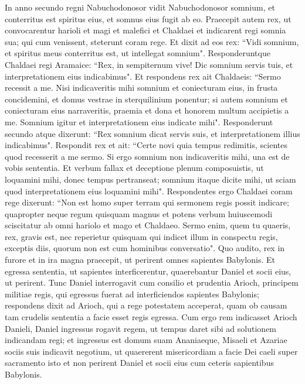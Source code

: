 \begin{biblechapter}  
\verse In anno secundo regni Nabuchodonosor vidit Nabuchodonosor somnium, et conterritus est spiritus eius, et somnus eius fugit ab eo. 
\verse Praecepit autem rex, ut convocarentur harioli et magi et malefici et Chaldaei et indicarent regi somnia sua; qui cum venissent, steterunt coram rege. 
\verse Et dixit ad eos rex: “Vidi somnium, et spiritus meus conterritus est, ut intellegat somnium". 
\verse Responderuntque Chaldaei regi Aramaice: “Rex, in sempiternum vive! Dic somnium servis tuis, et interpretationem eius indicabimus". 
\verse Et respondens rex ait Chaldaeis: “Sermo recessit a me. Nisi indicaveritis mihi somnium et coniecturam eius, in frusta concidemini, et domus vestrae in sterquilinium ponentur; 
\verse si autem somnium et coniecturam eius narraveritis, praemia et dona et honorem multum accipietis a me. Somnium igitur et interpretationem eius indicate mihi".  
\verse Responderunt secundo atque dixerunt: “Rex somnium dicat servis suis, et interpretationem illius indicabimus". 
\verse Respondit rex et ait: “Certe novi quia tempus redimitis, scientes quod recesserit a me sermo. 
\verse Si ergo somnium non indicaveritis mihi, una est de vobis sententia. Et verbum fallax et deceptione plenum composuistis, ut loquamini mihi, donec tempus pertranseat; somnium itaque dicite mihi, ut sciam quod interpretationem eius loquamini mihi". 
\verse Respondentes ergo Chaldaei coram rege dixerunt: “Non est homo super terram qui sermonem regis possit indicare; quapropter neque regum quisquam magnus et potens verbum huiuscemodi sciscitatur ab omni hariolo et mago et Chaldaeo. 
\verse Sermo enim, quem tu quaeris, rex, gravis est, nec reperietur quisquam qui indicet illum in conspectu regis, exceptis diis, quorum non est cum hominibus conversatio". 
\verse Quo audito, rex in furore et in ira magna praecepit, ut perirent omnes sapientes Babylonis. 
\verse Et egressa sententia, ut sapientes interficerentur, quaerebantur Daniel et socii eius, ut perirent. 
\verse Tunc Daniel interrogavit cum consilio et prudentia Arioch, principem militiae regis, qui egressus fuerat ad interficiendos sapientes Babylonis; 
\verse respondens dixit ad Arioch, qui a rege potestatem acceperat, quam ob causam tam crudelis sententia a facie esset regis egressa. Cum ergo rem indicasset Arioch Danieli, 
\verse Daniel ingressus rogavit regem, ut tempus daret sibi ad solutionem indicandam regi; 
\verse et ingressus est domum suam Ananiaeque, Misaeli et Azariae sociis suis indicavit negotium, 
\verse ut quaererent misericordiam a facie Dei caeli super sacramento isto et non perirent Daniel et socii eius cum ceteris sapientibus Babylonis. 

\end{biblechapter}
